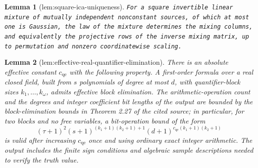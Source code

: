 \documentclass{article}
\newtheorem{lemma}{Lemma}
\begin{document}
\begin{lemma}[lem:square-ica-uniqueness]\label{lem:square-ica-uniqueness}
\texttt{For a square invertible linear mixture of mutually independent nonconstant sources,\allowbreak{} of which at most one is Gaussian,\allowbreak{} the law of the mixture determines the mixing columns,\allowbreak{} and equivalently the projective rows of the inverse mixing matrix,\allowbreak{} up to permutation and nonzero coordinatewise scaling.}
\end{lemma}

\begin{lemma}[lem:effective-real-quantifier-elimination]\label{lem:effective-real-quantifier-elimination}
There is an absolute effective constant \(c_{\mathrm{qe}}\) with the following property.  A first-order formula over a real closed field, built from \(s\) polynomials of degree at most \(d\), with quantifier-block sizes \(k_1,\ldots,k_\omega\), admits effective block elimination.  The arithmetic-operation count and the degrees and integer coefficient bit lengths of the output are bounded by the block-elimination bounds in Theorem 2.27 of the cited source; in particular, for two blocks and no free variables, a bit-operation bound of the form
\[
(\tau+1)^2(s+1)^{(k_1+1)(k_2+1)+1}(d+1)^{c_{\mathrm{qe}}(k_1+1)(k_2+1)}
\]
is valid after increasing \(c_{\mathrm{qe}}\) once and using ordinary exact integer arithmetic.  The output includes the finite sign conditions and algebraic sample descriptions needed to verify the truth value.
\end{lemma}
\end{document}
